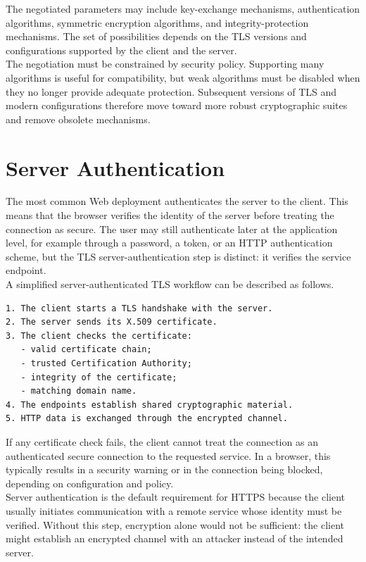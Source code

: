 \documentclass{scrbook}
\begin{document}
The negotiated parameters may include key-exchange mechanisms, authentication algorithms, symmetric encryption algorithms, and integrity-protection mechanisms. The set of possibilities depends on the TLS versions and configurations supported by the client and the server.\\

The negotiation must be constrained by security policy. Supporting many algorithms is useful for compatibility, but weak algorithms must be disabled when they no longer provide adequate protection. Subsequent versions of TLS and modern configurations therefore move toward more robust cryptographic suites and remove obsolete mechanisms.

\section{Server Authentication}

The most common Web deployment authenticates the server to the client. This means that the browser verifies the identity of the server before treating the connection as secure. The user may still authenticate later at the application level, for example through a password, a token, or an HTTP authentication scheme, but the TLS server-authentication step is distinct: it verifies the service endpoint.\\

A simplified server-authenticated TLS workflow can be described as follows.

\begin{lstlisting}
1. The client starts a TLS handshake with the server.
2. The server sends its X.509 certificate.
3. The client checks the certificate:
   - valid certificate chain;
   - trusted Certification Authority;
   - integrity of the certificate;
   - matching domain name.
4. The endpoints establish shared cryptographic material.
5. HTTP data is exchanged through the encrypted channel.
\end{lstlisting}

If any certificate check fails, the client cannot treat the connection as an authenticated secure connection to the requested service. In a browser, this typically results in a security warning or in the connection being blocked, depending on configuration and policy.\\

Server authentication is the default requirement for HTTPS because the client usually initiates communication with a remote service whose identity must be verified. Without this step, encryption alone would not be sufficient: the client might establish an encrypted channel with an attacker instead of the intended server.
\end{document}
